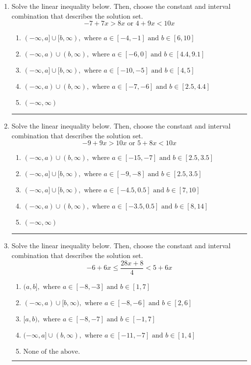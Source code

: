 \documentclass[14pt]{extbook}
\newcommand{\litem}[1]{\item#1\hspace*{-1cm}\rule{\textwidth}{0.4pt}}
\begin{document}
\begin{enumerate}
{\begin{enumerate}[label=\Alph*.]
\end{enumerate} }
\litem{
Solve the linear inequality below. Then, choose the constant and interval combination that describes the solution set.\[ -7 + 7 x > 8 x \text{ or } 4 + 9 x < 10 x \]\begin{enumerate}[label=\Alph*.]
\item \( (-\infty, a] \cup [b, \infty), \text{ where } a \in [-4, -1] \text{ and } b \in [6, 10] \)
\item \( (-\infty, a) \cup (b, \infty), \text{ where } a \in [-6, 0] \text{ and } b \in [4.4, 9.1] \)
\item \( (-\infty, a] \cup [b, \infty), \text{ where } a \in [-10, -5] \text{ and } b \in [4, 5] \)
\item \( (-\infty, a) \cup (b, \infty), \text{ where } a \in [-7, -6] \text{ and } b \in [2.5, 4.4] \)
\item \( (-\infty, \infty) \)

\end{enumerate} }
\litem{
Solve the linear inequality below. Then, choose the constant and interval combination that describes the solution set.\[ -9 + 9 x > 10 x \text{ or } 5 + 8 x < 10 x \]\begin{enumerate}[label=\Alph*.]
\item \( (-\infty, a) \cup (b, \infty), \text{ where } a \in [-15, -7] \text{ and } b \in [2.5, 3.5] \)
\item \( (-\infty, a] \cup [b, \infty), \text{ where } a \in [-9, -8] \text{ and } b \in [2.5, 3.5] \)
\item \( (-\infty, a] \cup [b, \infty), \text{ where } a \in [-4.5, 0.5] \text{ and } b \in [7, 10] \)
\item \( (-\infty, a) \cup (b, \infty), \text{ where } a \in [-3.5, 0.5] \text{ and } b \in [8, 14] \)
\item \( (-\infty, \infty) \)

\end{enumerate} }
\litem{
Solve the linear inequality below. Then, choose the constant and interval combination that describes the solution set.\[ -6 + 6 x \leq \frac{28 x + 8}{4} < 5 + 6 x \]\begin{enumerate}[label=\Alph*.]
\item \( (a, b], \text{ where } a \in [-8, -3] \text{ and } b \in [1, 7] \)
\item \( (-\infty, a) \cup [b, \infty), \text{ where } a \in [-8, -6] \text{ and } b \in [2, 6] \)
\item \( [a, b), \text{ where } a \in [-8, -7] \text{ and } b \in [-1, 7] \)
\item \( (-\infty, a] \cup (b, \infty), \text{ where } a \in [-11, -7] \text{ and } b \in [1, 4] \)
\item \( \text{None of the above.} \)


\end{enumerate}}
\end{enumerate}
\end{document}
